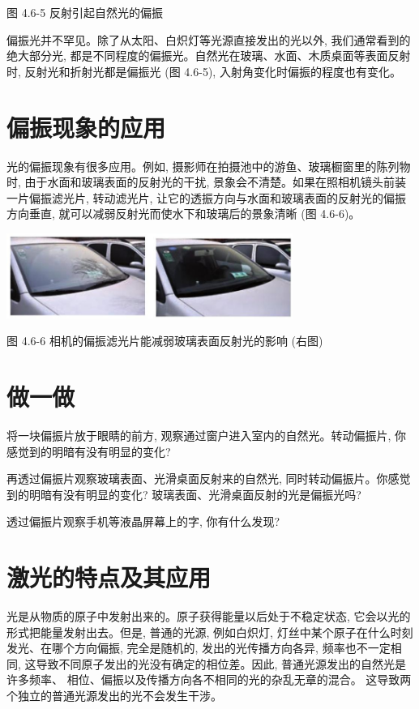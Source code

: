 \documentclass[10pt]{article}
\begin{document}
图 4.6-5 反射引起自然光的偏振

偏振光并不罕见。除了从太阳、白炽灯等光源直接发出的光以外, 我们通常看到的绝大部分光, 都是不同程度的偏振光。自然光在玻璃、水面、木质桌面等表面反射时, 反射光和折射光都是偏振光 (图 4.6-5), 入射角变化时偏振的程度也有变化。

\section*{偏振现象的应用}

光的偏振现象有很多应用。例如, 摄影师在拍摄池中的游鱼、玻璃橱窗里的陈列物时, 由于水面和玻璃表面的反射光的干扰, 景象会不清楚。如果在照相机镜头前装一片偏振滤光片, 转动滤光片, 让它的透振方向与水面和玻璃表面的反射光的偏振方向垂直, 就可以减弱反射光而使水下和玻璃后的景象清晰 (图 4.6-6)。

\begin{center}
\includegraphics[max width=0.7\textwidth]{images/01910e4c-ebb8-7d2c-8f2f-2375bc1d2d12_115_882647.jpg}
\end{center}

图 4.6-6 相机的偏振滤光片能减弱玻璃表面反射光的影响 (右图)

\section*{做一做}

将一块偏振片放于眼睛的前方, 观察通过窗户进入室内的自然光。转动偏振片, 你感觉到的明暗有没有明显的变化?

再透过偏振片观察玻璃表面、光滑桌面反射来的自然光, 同时转动偏振片。你感觉到的明暗有没有明显的变化? 玻璃表面、光滑桌面反射的光是偏振光吗?

透过偏振片观察手机等液晶屏幕上的字, 你有什么发现?

\section*{激光的特点及其应用}

光是从物质的原子中发射出来的。原子获得能量以后处于不稳定状态, 它会以光的形式把能量发射出去。但是, 普通的光源, 例如白炽灯, 灯丝中某个原子在什么时刻发光、在哪个方向偏振, 完全是随机的, 发出的光传播方向各异, 频率也不一定相同, 这导致不同原子发出的光没有确定的相位差。因此, 普通光源发出的自然光是许多频率、 相位、偏振以及传播方向各不相同的光的杂乱无章的混合。 这导致两个独立的普通光源发出的光不会发生干涉。
\end{document}
